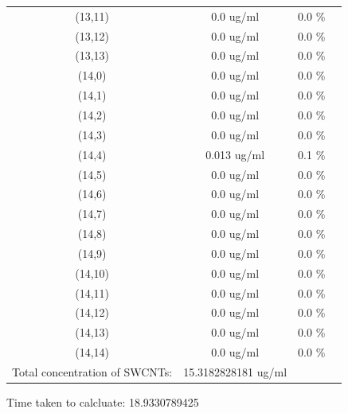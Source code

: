 \documentclass{article}
\begin{document}
\begin{tabular}{c c c c}
(13,11)&        0.0 ug/ml        &0.0 \%\\
(13,12)&        0.0 ug/ml        &0.0 \%\\
(13,13)&        0.0 ug/ml        &0.0 \%\\
(14,0)&        0.0 ug/ml        &0.0 \%\\
(14,1)&        0.0 ug/ml        &0.0 \%\\
(14,2)&        0.0 ug/ml        &0.0 \%\\
(14,3)&        0.0 ug/ml        &0.0 \%\\
(14,4)&        0.013 ug/ml        &0.1 \%\\
(14,5)&        0.0 ug/ml        &0.0 \%\\
(14,6)&        0.0 ug/ml        &0.0 \%\\
(14,7)&        0.0 ug/ml        &0.0 \%\\
(14,8)&        0.0 ug/ml        &0.0 \%\\
(14,9)&        0.0 ug/ml        &0.0 \%\\
(14,10)&        0.0 ug/ml        &0.0 \%\\
(14,11)&        0.0 ug/ml        &0.0 \%\\
(14,12)&        0.0 ug/ml        &0.0 \%\\
(14,13)&        0.0 ug/ml        &0.0 \%\\
(14,14)&        0.0 ug/ml        &0.0 \%\\
Total concentration of SWCNTs: &15.3182828181 ug/ml\\

\end{tabular}Time taken to calcluate: 18.9330789425
\end{document}
